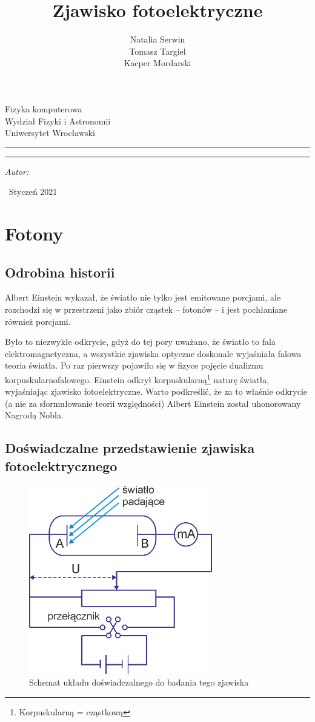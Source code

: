 \documentclass[12pt, a4paper, notitlepage]{report}
\author{Natalia Serwin\\Tomasz Targiel\\Kacper Mordarski}
\title{Zjawisko fotoelektryczne}
\makeatletter
\newcommand{\linia}{\rule{\linewidth}{0.4mm}}
\renewcommand{\maketitle}{\begin{titlepage}
	\vspace*{1cm}
	\begin{center}
		\small Fizyka komputerowa\\Wydział Fizyki i Astronomii\\Uniwersytet Wrocławski
	\end{center}
	\vspace{3cm}
	\noindent
	\linia
	\begin{center}
		\LARGE \textsc{\@title}
	\end{center}
	\linia
	\vspace{0.5cm}
	\begin{flushright}
		\begin{minipage}{5cm}
			\textit{\small Autor:}\\ \normalsize \textsc{\@author} \par
		\end{minipage}
		\vspace{5cm}
	\end{flushright}
	\vspace*{\stretch{6}}
	\begin{center}
		\ Styczeń 2021
	\end{center}
\end{titlepage}%
}
\makeatother
\begin{document}
	\maketitle

	\chapter{Fotony}
	\section{Odrobina historii}

	Albert Einstein wykazał, że światło nie tylko jest emitowane porcjami, ale
	rozchodzi się w przestrzeni jako zbiór cząstek – fotonów – i jest pochłaniane
	również porcjami.

	Było to niezwykłe odkrycie, gdyż do tej pory uważano, że światło to fala
	elektromagnetyczna, a wszystkie zjawiska optyczne doskonale wyjaśniała falowa teoria
	światła. Po raz pierwszy pojawiło się w fizyce pojęcie dualizmu
	korpuskularnofalowego. Einstein odkrył korpuskularną\footnote{Korpuskularną =
	cząstkową} naturę światła, wyjaśniając zjawisko fotoelektryczne. Warto
	podkreślić, że za to właśnie odkrycie (a nie za sformułowanie teorii
	względności) Albert Einstein został uhonorowany Nagrodą Nobla.

	\section{Doświadczalne przedstawienie zjawiska fotoelektrycznego}

	\begin{figure}[htp]
		\centering
		\includegraphics[width=8cm]{img/rysunek_1.1.png}
		\caption{Schemat układu doświadczalnego do badania tego zjawiska}
		\label{fig:1}
	\end{figure}
\end{document}
